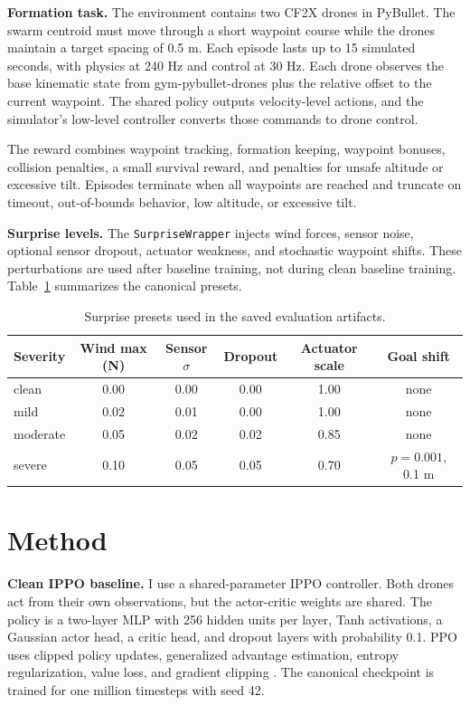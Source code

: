 \documentclass{article}
\begin{document}
\textbf{Formation task.} The environment contains two CF2X drones in PyBullet. The swarm centroid must move through a short waypoint course while the drones maintain a target spacing of 0.5 m. Each episode lasts up to 15 simulated seconds, with physics at 240 Hz and control at 30 Hz. Each drone observes the base kinematic state from gym-pybullet-drones plus the relative offset to the current waypoint. The shared policy outputs velocity-level actions, and the simulator's low-level controller converts those commands to drone control.

The reward combines waypoint tracking, formation keeping, waypoint bonuses, collision penalties, a small survival reward, and penalties for unsafe altitude or excessive tilt. Episodes terminate when all waypoints are reached and truncate on timeout, out-of-bounds behavior, low altitude, or excessive tilt.

\textbf{Surprise levels.} The \texttt{SurpriseWrapper} injects wind forces, sensor noise, optional sensor dropout, actuator weakness, and stochastic waypoint shifts. These perturbations are used after baseline training, not during clean baseline training. Table~\ref{tab:surprises} summarizes the canonical presets.

\begin{table}[t]
  \centering
  \small
  \caption{Surprise presets used in the saved evaluation artifacts.}
  \label{tab:surprises}
  \begin{tabular}{lccccc}
    \toprule
    Severity & Wind max (N) & Sensor $\sigma$ & Dropout & Actuator scale & Goal shift \\
    \midrule
    clean & 0.00 & 0.00 & 0.00 & 1.00 & none \\
    mild & 0.02 & 0.01 & 0.00 & 1.00 & none \\
    moderate & 0.05 & 0.02 & 0.02 & 0.85 & none \\
    severe & 0.10 & 0.05 & 0.05 & 0.70 & $p=0.001$, 0.1 m \\
    \bottomrule
  \end{tabular}
\end{table}

\section{Method}

\textbf{Clean IPPO baseline.} I use a shared-parameter IPPO controller. Both drones act from their own observations, but the actor-critic weights are shared. The policy is a two-layer MLP with 256 hidden units per layer, Tanh activations, a Gaussian actor head, a critic head, and dropout layers with probability 0.1. PPO uses clipped policy updates, generalized advantage estimation, entropy regularization, value loss, and gradient clipping \citep{schulman2017proximal}. The canonical checkpoint is trained for one million timesteps with seed 42.
\end{document}

